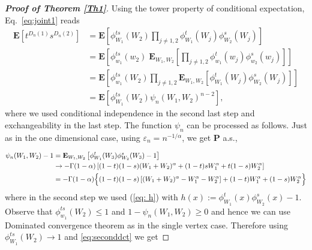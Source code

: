 \documentclass[11pt, reqno]{amsart}
\numberwithin{equation}{section}
\theoremstyle{plain} %
\theoremstyle{definition} %
\newcommand{\eps}{\varepsilon}
\newcommand{\prob}{\mathbf{P}}
\newcommand{\E}{\mathbf{E}}
\begin{document}
\begin{proof}[{\bf Proof of Theorem \ref{Th1}}]
Using the tower property of conditional expectation,  Eq.~\eqref{eq:joint1} reads
\begin{equation}
     \begin{split}
    \E \left[ t^{D_n(1)} s^{D_n(2)}\right]     &=  \E \left[ \phi_{W_1}^{t s}(W_2) \prod_{j \neq 1,2} \phi_{W_1}^{t}(W_j) \phi_{W_2}^{s}(W_j) \right] \\
     &= \E \left[   \phi_{w_1}^{t s}(w_2)   \; \E_{W_1, W_2} \left[ \prod_{j \neq 1,2}  \phi_{w_1}^{t}(w_j) \phi_{w_2}^{s}(w_j) \right] \right] \\
     &=\E\left[   \phi_{w_1}^{t s}(W_2)  \prod_{j \neq 1,2}\E_{W_1, W_2} \left[  \phi_{W_1}^{t}(W_j) \phi_{W_2}^{s}(W_j) \right] \right]  \\
    &=  \E\left[   \phi_{W_1}^{t s}(W_2)   \psi_n(W_1, W_2)^{n-2} \right],
     \end{split}
\end{equation}
where we used conditional independence in the second last step and exchangeability in the last step. The function $\psi_n$ can be processed as follows. Just as in the one dimensional case,  using $\eps_n=n^{-1/\alpha}$,  we get $\prob$ a.s., 

\begin{equation}\label{eq:seconddct}
\begin{split}
      \psi_n(W_1, W_2)-1&= \E_{W_1, W_2} \left[  \phi_{W_1}^{t}(W_3) \phi_{W_2}^{s}(W_3) - 1 \right] \\
      &\to -\Gamma(1- \alpha) \left[ (1-t)(1-s)(W_1+W_2)^{\alpha} + (1-t) s W_1^{\alpha} +  t(1-s) W_2^{\alpha} \right]\\
      &= - \Gamma(1- \alpha) \Big{\{} (1-t)(1-s)\left[(W_1+W_2)^{\alpha} -W_1^{\alpha} - W_2^{\alpha}\right]  +(1-t) W_1^{\alpha} +  (1-s) W_2^{\alpha} \Big{\}}
\end{split}
\end{equation}
where in the second step we used (\ref{eq: h}) with $h(x) := \phi_{W_1}^{t}(x) \phi_{W_2}^{s}(x) -1$. Observe that $\phi_{w_1}^{t s}(W_2)\le 1$ and $1-\psi_n(W_1, W_2)\ge 0$ and hence we can use Dominated convergence theorem as in the single vertex case. Therefore using $\phi_{W_1}^{t s}(W_2)\to 1$ and \eqref{eq:seconddct} we get


\end{proof}
\end{document}
